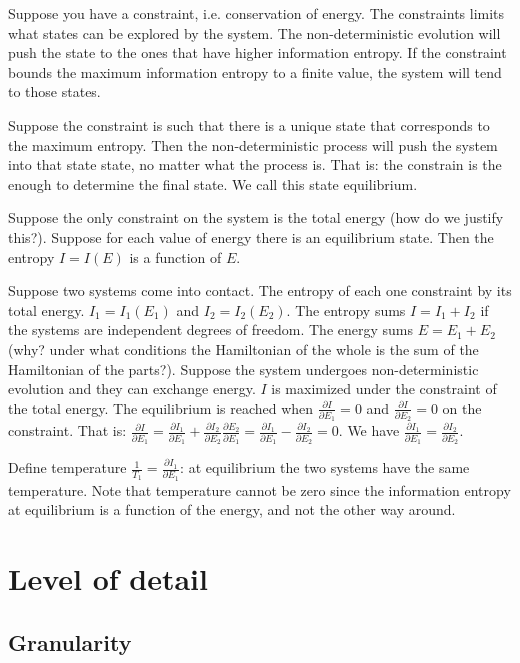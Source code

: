\documentclass[11pt,letterpaper,fleqn]{memoir} %
\begin{document}
Suppose you have a constraint, i.e. conservation of energy. The constraints limits what states can be explored by the system. The non-deterministic evolution will push the state to the ones that have higher information entropy. If the constraint bounds the maximum information entropy to a finite value, the system will tend to those states.

Suppose the constraint is such that there is a unique state that corresponds to the maximum entropy. Then the non-deterministic process will push the system into that state state, no matter what the process is. That is: the constrain is the enough to determine the final state. We call this state equilibrium.

Suppose the only constraint on the system is the total energy (how do we justify this?). Suppose for each value of energy there is an equilibrium state. Then the entropy $I=I(E)$ is a function of $E$.

Suppose two systems come into contact. The entropy of each one constraint by its total energy. $I_1=I_1(E_1)$ and $I_2=I_2(E_2)$. The entropy sums $I=I_1+I_2$ if the systems are independent degrees of freedom. The energy sums $E=E_1+E_2$ (why? under what conditions the Hamiltonian of the whole is the sum of the Hamiltonian of the parts?). Suppose the system undergoes non-deterministic evolution and they can exchange energy. $I$ is maximized under the constraint of the total energy. The equilibrium is reached when $\frac{\partial I}{\partial E_1} = 0$ and $\frac{\partial I}{\partial E_2} = 0$ on the constraint. That is: $\frac{\partial I}{\partial E_1} = \frac{\partial I_1}{\partial E_1} +\frac{\partial I_2}{\partial E_2} \frac{\partial E_2}{\partial E_1} = \frac{\partial I_1}{\partial E_1} -\frac{\partial I_2}{\partial E_2}=0$. We have $\frac{\partial I_1}{\partial E_1} = \frac{\partial I_2}{\partial E_2}$.

Define temperature $\frac{1}{T_1} = \frac{\partial I_1}{\partial E_1}$: at equilibrium the two systems have the same temperature. Note that temperature cannot be zero since the information entropy at equilibrium is a function of the energy, and not the other way around.




\iffalse

\chapter{Level of detail}

\section{Granularity}
\end{document}
